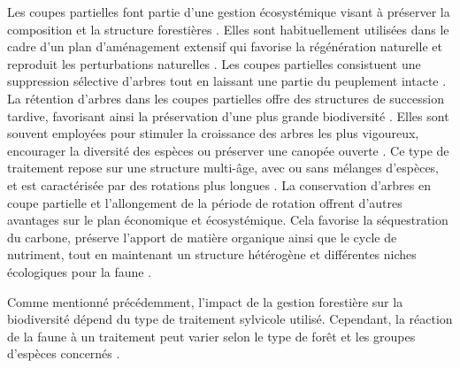 Les coupes partielles font partie d'une gestion écosystémique visant à préserver la composition et la structure forestières \citep{Bergeron1999Forestmanagementa}.
Elles sont habituellement utilisées dans le cadre d'un plan d'aménagement extensif qui favorise la régénération naturelle et reproduit les perturbations naturelles \citep{Irland2011Timberproductivity}. 
Les coupes partielles consistuent une suppression sélective d'arbres tout en laissant une partie du peuplement intacte \citep{Ameray2021Forestcarbon}. 
La rétention d'arbres dans les coupes partielles offre des structures de succession tardive, favorisant ainsi la préservation d'une plus grande biodiversité \citep{Ameray2021Forestcarbon}.
Elles sont souvent employées pour stimuler la croissance des arbres les plus vigoureux, encourager la diversité des espèces ou préserver une canopée ouverte \citep{Irland2011Timberproductivity}.
Ce type de traitement repose sur une structure multi-âge, avec ou sans mélanges d'espèces, et est caractérisée par des rotations plus longues \citep{Kuuluvainen2009Forestmanagement}. 
La conservation d'arbres en coupe partielle et l'allongement de la période de rotation offrent d'autres avantages sur le plan économique et écosystémique. 
Cela favorise la séquestration du carbone, préserve l'apport de matière organique ainsi que le cycle de nutriment, tout en maintenant un structure hétérogène et différentes niches écologiques pour la faune \citep{Barg1999Influencepartial,Tong2020Forestmanagement,Ameray2021Forestcarbon}.

Comme mentionné précédemment, l'impact de la gestion forestière sur la biodiversité dépend du type de traitement sylvicole utilisé. Cependant, la réaction de la faune à un traitement peut varier selon le type de forêt et les groupes d'espèces concernés \citep{Paillet2010Biodiversitydifferences,Kudrin2023metaanalysiseffects}.


